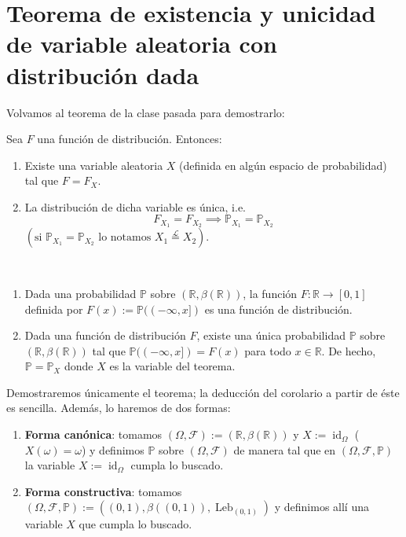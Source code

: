 \section{Teorema de existencia y unicidad de variable aleatoria con distribución dada}

Volvamos al teorema de la clase pasada para demostrarlo:

\begin{theorem}
    Sea \(F\) una función de distribución. Entonces:
    \begin{enumerate}
        \item Existe una variable aleatoria \(X\) (definida en algún espacio de probabilidad) tal que \(F = F_X\).
        \item La distribución de dicha variable es única, i.e.
        \[
		F_{X_1} = F_{X_2} \implies \mathbb{P}_{X_1} = \mathbb{P}_{X_2} \]
		$(\text{si } \mathbb{P}_{X_1} = \mathbb{P}_{X_2} \text{ lo notamos } X_1 \overset{\mathcal{L}}{=} X_2)$.
    \end{enumerate}
\end{theorem}

\begin{corollary}~
    \begin{enumerate}
        \item Dada una probabilidad \(\mathbb{P}\) sobre \((\mathbb{R}, \beta(\mathbb{R}))\), la función \(F: \mathbb{R} \to [0,1]\) definida por \(F(x) := \mathbb{P}((-\infty, x])\) es una función de distribución.

        \item Dada una función de distribución \(F\), existe una única probabilidad \(\mathbb{P}\) sobre \((\mathbb{R}, \beta(\mathbb{R}))\) tal que \(\mathbb{P}((-\infty, x]) = F(x)\) para todo \(x \in \mathbb{R}\). De hecho, \(\mathbb{P} = \mathbb{P}_X\) donde \(X\) es la variable del teorema.
    \end{enumerate}
\end{corollary}
\medskip \par
Demostraremos únicamente el teorema; la deducción del corolario a partir de éste es sencilla. Además, lo haremos de dos formas:

\begin{enumerate}
    \item \textbf{Forma canónica}: tomamos \((\Omega, \mathcal{F}) := (\mathbb{R}, \beta(\mathbb{R}))\) y \(X := \operatorname{id}_\Omega\) (\(X(\omega) = \omega\)) y definimos \(\mathbb{P}\) sobre \((\Omega, \mathcal{F})\) de manera tal que en \((\Omega, \mathcal{F}, \mathbb{P})\) la variable \(X := \operatorname{id}_\Omega\) cumpla lo buscado.
	\item \textbf{Forma constructiva}: tomamos \((\Omega, \mathcal{F}, \mathbb{P}) := ((0,1), \beta((0,1)), \operatorname{Leb}_{(0,1)})\) y definimos allí una variable \(X\) que cumpla lo buscado.
\end{enumerate}

